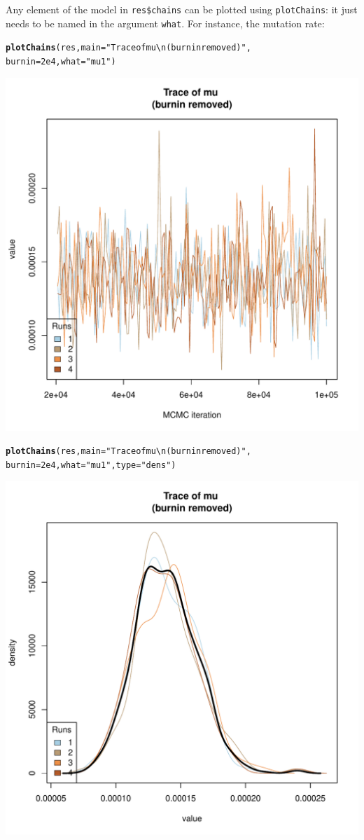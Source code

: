 \documentclass{article}\usepackage[]{graphicx}\usepackage[]{color}
\makeatletter
\newcommand{\hlnum}[1]{\textcolor[rgb]{0.686,0.059,0.569}{#1}}%
\newcommand{\hlstr}[1]{\textcolor[rgb]{0.192,0.494,0.8}{#1}}%
\newcommand{\hlstd}[1]{\textcolor[rgb]{0.345,0.345,0.345}{#1}}%
\newcommand{\hlkwc}[1]{\textcolor[rgb]{0.333,0.667,0.333}{#1}}%
\newcommand{\hlkwd}[1]{\textcolor[rgb]{0.737,0.353,0.396}{\textbf{#1}}}%
\newenvironment{kframe}{%
 \def\at@end@of@kframe{}%
 \ifinner\ifhmode%
  \def\at@end@of@kframe{\end{minipage}}%
  \begin{minipage}{\columnwidth}%
 \fi\fi%
 \def\FrameCommand##1{\hskip\@totalleftmargin \hskip-\fboxsep
 \colorbox{shadecolor}{##1}\hskip-\fboxsep
     \hskip-\linewidth \hskip-\@totalleftmargin \hskip\columnwidth}%
 \MakeFramed {\advance\hsize-\width
   \@totalleftmargin\z@ \linewidth\hsize
   \@setminipage}}%
 {\par\unskip\endMakeFramed%
 \at@end@of@kframe}
\newenvironment{knitrout}{}{} %
\makeatother
\begin{document}
Any element of the model in \texttt{res\$chains} can be plotted using \texttt{plotChains}: it just
needs to be named in the argument \texttt{what}.
For instance, the mutation rate:
\begin{knitrout}
\color{fgcolor}\begin{kframe}
\begin{alltt}
\hlkwd{plotChains}\hlstd{(res,} \hlkwc{main}\hlstd{=}\hlstr{"Trace of mu \textbackslash{}n(burnin removed)"}\hlstd{,}
           \hlkwc{burnin}\hlstd{=}\hlnum{2e4}\hlstd{,} \hlkwc{what}\hlstd{=}\hlstr{"mu1"}\hlstd{)}
\end{alltt}
\end{kframe}

{\centering \includegraphics[width=.6\textwidth]{figs/unnamed-chunk-341} 

}


\begin{kframe}\begin{alltt}
\hlkwd{plotChains}\hlstd{(res,} \hlkwc{main}\hlstd{=}\hlstr{"Trace of mu \textbackslash{}n(burnin removed)"}\hlstd{,}
           \hlkwc{burnin}\hlstd{=}\hlnum{2e4}\hlstd{,} \hlkwc{what}\hlstd{=}\hlstr{"mu1"}\hlstd{,} \hlkwc{type}\hlstd{=}\hlstr{"dens"}\hlstd{)}
\end{alltt}
\end{kframe}

{\centering \includegraphics[width=.6\textwidth]{figs/unnamed-chunk-342} 

}



\end{knitrout}
\end{document}
